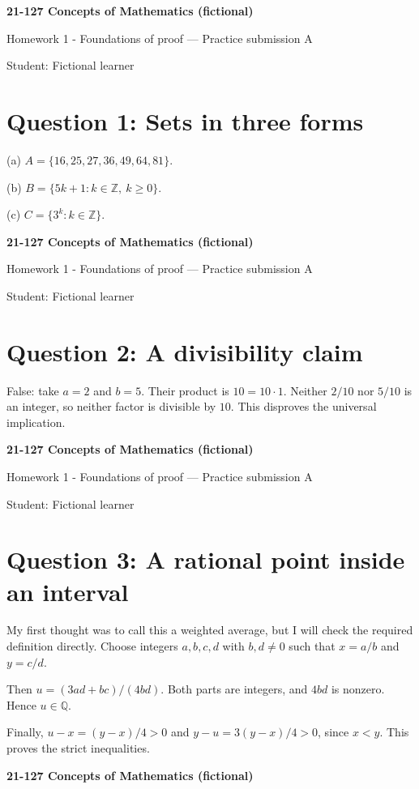 \documentclass[11pt]{article}
\begin{document}
\textbf{21-127 Concepts of Mathematics (fictional)}

Homework 1 - Foundations of proof --- Practice submission A

Student: Fictional learner

\section*{Question 1: Sets in three forms}

(a) $A=\{16,25,27,36,49,64,81\}$.

(b) $B=\{5k+1:k\in\mathbb{Z},\ k\geq0\}$.

(c) $C=\{3^k:k\in\mathbb{Z}\}$.

\newpage
\textbf{21-127 Concepts of Mathematics (fictional)}

Homework 1 - Foundations of proof --- Practice submission A

Student: Fictional learner

\section*{Question 2: A divisibility claim}

False: take $a=2$ and $b=5$. Their product is $10=10\cdot1$. Neither $2/10$ nor $5/10$ is an integer, so neither factor is divisible by $10$. This disproves the universal implication.

\newpage
\textbf{21-127 Concepts of Mathematics (fictional)}

Homework 1 - Foundations of proof --- Practice submission A

Student: Fictional learner

\section*{Question 3: A rational point inside an interval}

My first thought was to call this a weighted average, but I will check the required definition directly. Choose integers $a,b,c,d$ with $b,d\neq0$ such that $x=a/b$ and $y=c/d$.

Then $u=(3ad+bc)/(4bd)$. Both parts are integers, and $4bd$ is nonzero. Hence $u\in\mathbb{Q}$.

Finally, $u-x=(y-x)/4>0$ and $y-u=3(y-x)/4>0$, since $x<y$. This proves the strict inequalities.

\newpage
\textbf{21-127 Concepts of Mathematics (fictional)}
\end{document}
